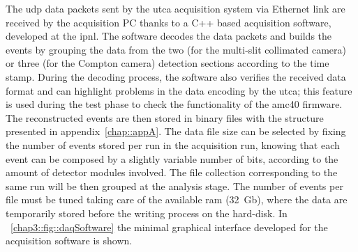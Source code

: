 The \gls{udp} data packets sent by the \gls{utca} acquisition system via Ethernet link are received by the acquisition PC thanks to a C++ based acquisition software, developed at the \gls{ipnl}. The software decodes the data packets and builds the events by grouping the data from the two (for the multi-slit collimated camera) or three (for the Compton camera) detection sections according to the time stamp. During the decoding process, the software also verifies the received data format and can highlight problems in the data encoding by the \gls{utca}; this feature is used during the test phase to check the functionality of the \gls{amc}40 firmware. The reconstructed events are then stored in binary files with the structure presented in appendix~\ref{chap::appA}. The data file size can be selected by fixing the number of events stored per run in the acquisition run, knowing that each event can be composed by a slightly variable number of bits, according to the amount of detector modules involved. The file collection corresponding to the same run will be then grouped at the analysis stage. The number of events per file must be tuned taking care of the available \gls{ram} (32~Gb), where the data are temporarily stored before the writing process on the hard-disk. In \figurename~\ref{chap3::fig::daqSoftware} the minimal graphical interface developed for the acquisition software is shown.

